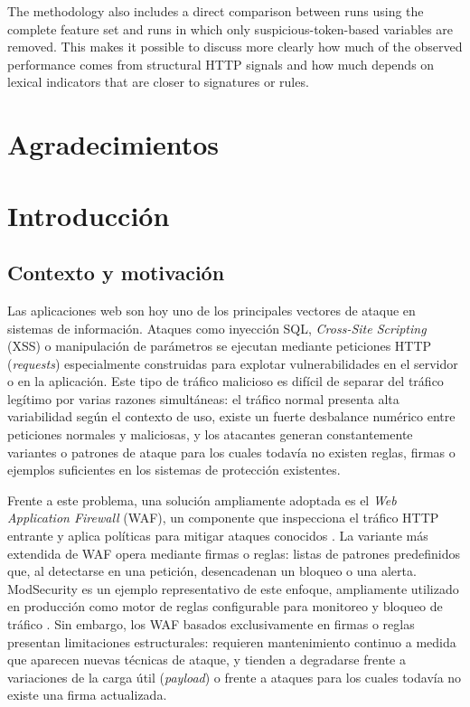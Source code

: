 \documentclass[12pt,oneside]{report}
\begin{document}
The methodology also includes a direct comparison between runs using the complete feature set and runs in which only suspicious-token-based variables are removed. This makes it possible to discuss more clearly how much of the observed performance comes from structural HTTP signals and how much depends on lexical indicators that are closer to signatures or rules.

\chapter*{Agradecimientos}

\tableofcontents
\listoffigures
\clearpage
{}

\chapter{Introducción}

\section{Contexto y motivación}
Las aplicaciones web son hoy uno de los principales vectores de ataque en sistemas de información. Ataques como inyección SQL, \textit{Cross-Site Scripting} (XSS) o manipulación de parámetros se ejecutan mediante peticiones HTTP (\textit{requests}) especialmente construidas para explotar vulnerabilidades en el servidor o en la aplicación. Este tipo de tráfico malicioso es difícil de separar del tráfico legítimo por varias razones simultáneas: el tráfico normal presenta alta variabilidad según el contexto de uso, existe un fuerte desbalance numérico entre peticiones normales y maliciosas, y los atacantes generan constantemente variantes o patrones de ataque para los cuales todavía no existen reglas, firmas o ejemplos suficientes en los sistemas de protección existentes.

Frente a este problema, una solución ampliamente adoptada es el \textit{Web Application Firewall} (WAF), un componente que inspecciona el tráfico HTTP entrante y aplica políticas para mitigar ataques conocidos \cite{owasp_waf}. La variante más extendida de WAF opera mediante firmas o reglas: listas de patrones predefinidos que, al detectarse en una petición, desencadenan un bloqueo o una alerta. ModSecurity es un ejemplo representativo de este enfoque, ampliamente utilizado en producción como motor de reglas configurable para monitoreo y bloqueo de tráfico \cite{modsecurity_site}. Sin embargo, los WAF basados exclusivamente en firmas o reglas presentan limitaciones estructurales: requieren mantenimiento continuo a medida que aparecen nuevas técnicas de ataque, y tienden a degradarse frente a variaciones de la carga útil (\textit{payload}) o frente a ataques para los cuales todavía no existe una firma actualizada.
\end{document}
